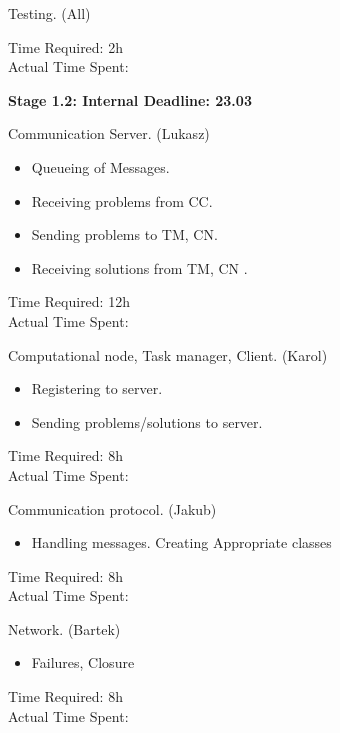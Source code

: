 \documentclass{article}
\begin{document}
\begin{itemize}
\begin{itemize}
\begin{enumerate}
			
					{\bf \item Testing. (All) \\}
					Time Required: 2h \\ 
					Actual Time Spent: \\
										
			\end{enumerate}
			
			\newpage
			
			{\item \large \bf Stage 1.2: Internal Deadline: 23.03 \\ }
			\begin{enumerate}
			
					{\bf \item Communication Server. (Lukasz) }
					\begin{itemize} [label=$\bullet$]
							\item Queueing of Messages.
							\item Receiving problems from CC.
							\item Sending problems to TM, CN.
							\item Receiving solutions from TM, CN	.
					\end{itemize}
					Time Required: 12h \\ 
					Actual Time Spent: \\
					
					{\bf \item Computational node, Task manager, Client. (Karol)}
					\begin{itemize} [label=$\bullet$]
							\item Registering to server.
							\item Sending problems/solutions to server.
					\end{itemize}		
					Time Required: 8h \\ 
					Actual Time Spent: \\
			
			
					{\bf \item Communication protocol. (Jakub)}
					\begin{itemize} [label=$\bullet$]
							\item Handling messages. Creating Appropriate classes
					\end{itemize}
					Time Required: 8h \\ 
					Actual Time Spent: \\
			
			
					{\bf \item Network. (Bartek) }
					\begin{itemize} [label=$\bullet$]
							\item Failures, Closure
					\end{itemize}
					Time Required: 8h \\ 
					Actual Time Spent: \\
			

\end{enumerate}
\end{itemize}
\end{itemize}
\end{document}
